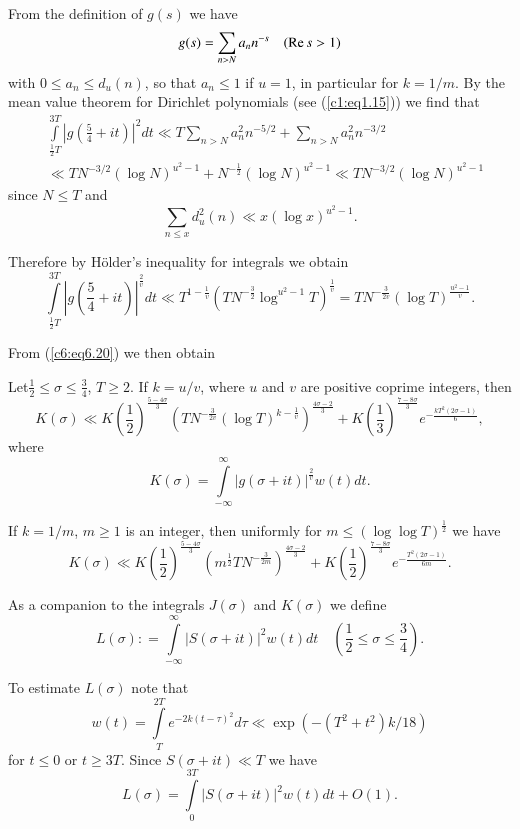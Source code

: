 From the definition of $g(s)$ we have
$$
g(s) = \sum\limits_{n > N} a_n n^{-s} \quad (\operatorname{Re} s >1)
$$
with $0 \leq a_n \leq d_u(n)$, so that $a_n \leq 1$ if $u=1$, in
particular for $k=1/m$. By the mean value theorem for Dirichlet
polynomials (see (\ref{c1:eq1.15})) we find that 
\begin{align*}
& \int\limits^{3T}_{\frac{1}{2}T} \left|g \left(\frac{5}{4} + it
  \right)\right|^2 dt \ll T \sum\limits_{n > N} a^2_n n^{-5/2} +
  \sum\limits_{n > N} a^2_n n^{-3/2}\\ 
& \ll TN^{-3/2} (\log N)^{u^2-1} + N^{-\frac{1}{2}} (\log N)^{u^2-1}
  \ll TN^{-3/2} (\log N)^{u^2-1} 
\end{align*}
since $N \leq T$ and 
$$
\sum\limits_{n \leq x} d^2_u (n) \ll x (\log x)^{u^2-1}.
$$

Therefore by H\"older's inequality for integrals we obtain
$$
\int\limits^{3T}_{\frac{1}{2} T} \left|g \left(\frac{5}{4} + it
\right)\right|^{\frac{2}{v}} dt \ll T^{1-\frac{1}{v}}
\left(TN^{-\frac{3}{2}} \log^{u^2-1} T\right)^{\frac{1}{v}} =
TN^{-\frac{3}{2v}} (\log T)^{\frac{u^2-1}{v}}. 
$$

From (\ref{c6:eq6.20}) we then obtain

\begin{lemma}\label{c6:lem6.6}
Let\pageoriginale $\frac{1}{2} \leq \sigma \leq \frac{3}{4} $, $T \geq
2$. If $k=u/v$, where $u$ and $v$ are positive coprime integers, then 
$$
K(\sigma) \ll K \left(\frac{1}{2} \right)^{\frac{5-4\sigma}{3}}
\left(TN^{-\frac{3}{2v}} (\log T)^{k-\frac{1}{v}}
\right)^{\frac{4\sigma-2}{3}} + K \left(\frac{1}{3}
\right)^{\frac{7-8\sigma}{3}} e^{-\frac{kT^2 (2\sigma -1)}{6}}, 
$$
where
$$
K(\sigma) = \int\limits^\infty_{-\infty} |g(\sigma +
it)|^{\frac{2}{v}} w (t) dt. 
$$

If $k =1 / m$, $m \geq 1$ is an integer, then uniformly for $m \leq
(\log \log T)^{\frac{1}{2}}$ we have  
$$
K(\sigma) \ll K \left(\frac{1}{2} \right)^{\frac{5-4\sigma}{3}}
\left(m^{\frac{1}{2}} TN^{-\frac{3}{2m}} \right)^{\frac{4\sigma -
    2}{3}} + K \left(\frac{1}{2} \right)^{\frac{7-8\sigma}{3}}
e^{-\frac{T^2 (2\sigma-1)}{6m}}. 
$$
\end{lemma}

\medskip
{} As a companion to the
integrals $J(\sigma)$ and $K(\sigma)$ we define 
$$
L(\sigma) : = \int\limits^\infty_{-\infty} |S(\sigma + it)|^2 w(t) dt
\quad \left(\frac{1}{2} \leq \sigma \leq\frac{3}{4}\right).  
$$

To estimate $L(\sigma)$ note that
$$
w(t) = \int\limits^{2T}_T e^{-2k(t-\tau)^2} d\tau \ll \exp \left(-(T^2
+ t^2) k/18\right) 
$$
for $t \leq 0$ or $t \geq 3T$. Since $S(\sigma + it) \ll T$ we have 
$$
L(\sigma) = \int\limits^{3T}_0 |S(\sigma + it)|^2 w(t) dt + O(1). 
$$

